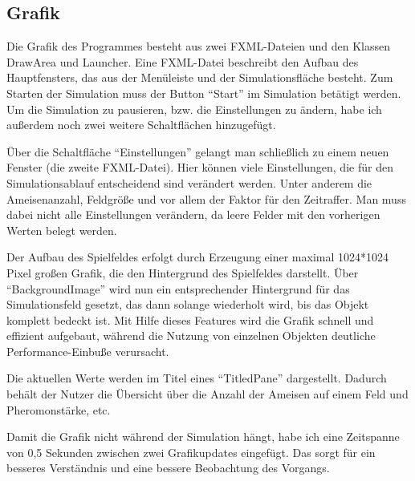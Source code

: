 \documentclass[a4paper,12pt]{scrartcl}
\begin{document}
\subsection*{Grafik}
Die Grafik des Programmes besteht aus zwei FXML-Dateien und den Klassen DrawArea und Launcher.
Eine FXML-Datei beschreibt den Aufbau des Hauptfensters, das aus der Menüleiste und der Simulationsfläche besteht. Zum Starten der Simulation muss der Button "`Start"' im Simulation betätigt werden. Um die Simulation zu pausieren, bzw. die Einstellungen zu ändern, habe ich außerdem noch zwei weitere Schaltflächen hinzugefügt.

Über die Schaltfläche "`Einstellungen"' gelangt man schließlich zu einem neuen Fenster (die zweite FXML-Datei). Hier können viele Einstellungen, die für den Simulationsablauf entscheidend sind verändert werden. Unter anderem die Ameisenanzahl, Feldgröße und vor allem der Faktor für den Zeitraffer. Man muss dabei nicht alle Einstellungen verändern, da leere Felder mit den vorherigen Werten belegt werden.

Der Aufbau des Spielfeldes erfolgt durch Erzeugung einer maximal 1024*1024 Pixel großen Grafik, die den Hintergrund des Spielfeldes darstellt. Über "`BackgroundImage"' wird nun ein entsprechender Hintergrund für das Simulationsfeld gesetzt, das dann solange wiederholt wird, bis das Objekt komplett bedeckt ist. Mit Hilfe dieses Features wird die Grafik schnell und effizient aufgebaut, während die Nutzung von einzelnen Objekten deutliche Performance-Einbuße verursacht.

Die aktuellen Werte werden im Titel eines "`TitledPane"' dargestellt. Dadurch behält der Nutzer die Übersicht über die Anzahl der Ameisen auf einem Feld und Pheromonstärke, etc.

Damit die Grafik nicht während der Simulation hängt, habe ich eine Zeitspanne von 0,5 Sekunden zwischen zwei Grafikupdates eingefügt. Das sorgt für ein besseres Verständnis und eine bessere Beobachtung des Vorgangs.
\end{document}
